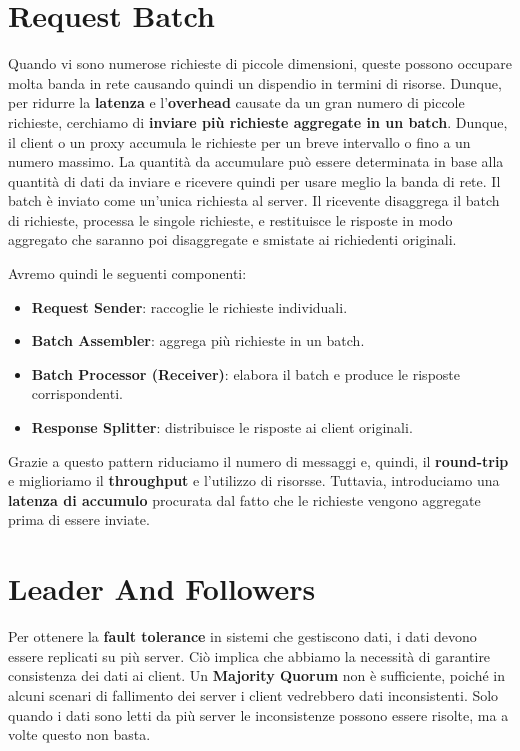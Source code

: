 \section{Request Batch}
Quando vi sono numerose richieste di piccole dimensioni, queste possono occupare molta banda in rete causando quindi un dispendio in termini di risorse. Dunque, per ridurre la \textbf{latenza} e l'\textbf{overhead} causate da un gran numero di piccole richieste, cerchiamo di \textbf{inviare più richieste aggregate in un batch}. Dunque, il client o un proxy accumula le richieste per un breve intervallo o fino a un numero massimo. La quantità da accumulare può essere determinata in base alla quantità di dati da inviare e ricevere quindi per usare meglio la banda di rete.
Il batch è inviato come un’unica richiesta al server. Il ricevente disaggrega il batch di richieste, processa le singole richieste, e restituisce le risposte in modo aggregato che saranno poi disaggregate e smistate ai richiedenti originali.

Avremo quindi le seguenti componenti:
\begin{itemize}
    \item \textbf{Request Sender}: raccoglie le richieste individuali.
    \item \textbf{Batch Assembler}: aggrega più richieste in un batch.
    \item \textbf{Batch Processor (Receiver)}: elabora il batch e produce le risposte corrispondenti.
    \item \textbf{Response Splitter}: distribuisce le risposte ai client originali.
\end{itemize}

Grazie a questo pattern riduciamo il numero di messaggi e, quindi, il \textbf{round-trip} e miglioriamo il \textbf{throughput} e l'utilizzo di risorsse. Tuttavia, introduciamo una \textbf{latenza di accumulo} procurata dal fatto che le richieste vengono aggregate prima di essere inviate. 

\section{Leader And Followers}
Per ottenere la \textbf{fault tolerance} in sistemi che gestiscono dati, i dati devono essere replicati su più server. Ciò implica che abbiamo la necessità di garantire consistenza dei dati ai client. Un \textbf{Majority Quorum} non è sufficiente, poiché in alcuni scenari di fallimento dei server i client vedrebbero dati inconsistenti. Solo quando i dati sono letti da più server le inconsistenze possono essere risolte, ma a volte questo non basta. 

